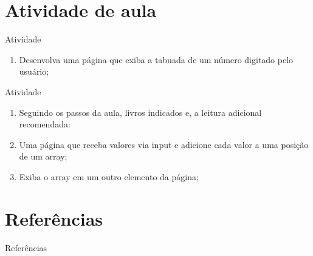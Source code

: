 \documentclass{beamer}
\begin{document}
\section{Atividade de aula}
\begin{frame}{Atividade}
  \begin{enumerate}
      \item Desenvolva uma página que exiba a tabuada de um número digitado pelo usuário;
  \end{enumerate}

\end{frame}
\begin{frame}{Atividade}
  \begin{enumerate}
      \item Seguindo os passos da aula, livros indicados e, a leitura adicional recomendada: 
      \item Uma página que receba valores via input e adicione cada valor a uma posição de um array;
      \item Exiba o array em um outro elemento da página;
  \end{enumerate}
\end{frame}

\section{Referências}

\begin{frame}{Referências}%
\small
\begin{center}
\tiny


\end{center}
\end{frame}
\end{document}
